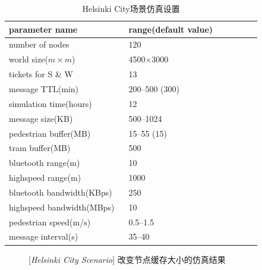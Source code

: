 \begin{table}
\centering
\caption{Helsinki City场景仿真设置}
\label{tab:chap5_simulation_helsinki}
\begin{tabular}{
p{0.45\linewidth}<{\centering}
p{0.5\linewidth}<{\centering}
}
\hline
\textbf{parameter name} & \textbf{range(default value)} \\
\hline
number of nodes & 120  \\
world size($m\times m$) & 4500$\times$3000  \\
tickets for S \& W & 13 \\
message TTL(min) & 200--500 (300) \\
simulation time(hours) & 12 \\
message size(KB) & 500--1024 \\
pedestrian buffer(MB) & 15--55 (15) \\
tram buffer(MB) & 500 \\
bluetooth range(m) & 10 \\
highspeed range(m) & 1000 \\ 
bluetooth bandwidth(KBps) & 250 \\
highspeed bandwidth(MBps) & 10 \\ 
pedestrian speed(m/s) & 0.5--1.5  \\
message interval(s) & 35--40 \\
\hline
\end{tabular}
\end{table}

\begin{figure}[tbp]
\centering
{}
\caption{[\emph{Helsinki City Scenario}] 改变节点缓存大小的仿真结果}
\label{fig:chap5_helsinki_buffer}
\end{figure}


